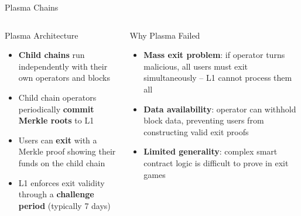 \documentclass[8pt,aspectratio=169]{beamer}
\begin{document}
\begin{frame}{Plasma Chains}
\begin{columns}[T]
\begin{block}{Plasma Architecture}
\footnotesize
\begin{itemize}
  \item \textbf{Child chains} run independently with their own operators and blocks
  \item Child chain operators periodically \textbf{commit Merkle roots} to L1
  \item Users can \textbf{exit} with a Merkle proof showing their funds on the child chain
  \item L1 enforces exit validity through a \textbf{challenge period} (typically 7 days)
\end{itemize}
\end{block}
\vspace{2mm}
\begin{alertblock}{Why Plasma Failed}
\footnotesize
\begin{itemize}
  \item \textbf{Mass exit problem}: if operator turns malicious, all users must exit simultaneously -- L1 cannot process them all
  \item \textbf{Data availability}: operator can withhold block data, preventing users from constructing valid exit proofs
  \item \textbf{Limited generality}: complex smart contract logic is difficult to prove in exit games
\end{itemize}
\end{alertblock}
\vspace{1mm}
\end{columns}
\end{frame}
\end{document}
